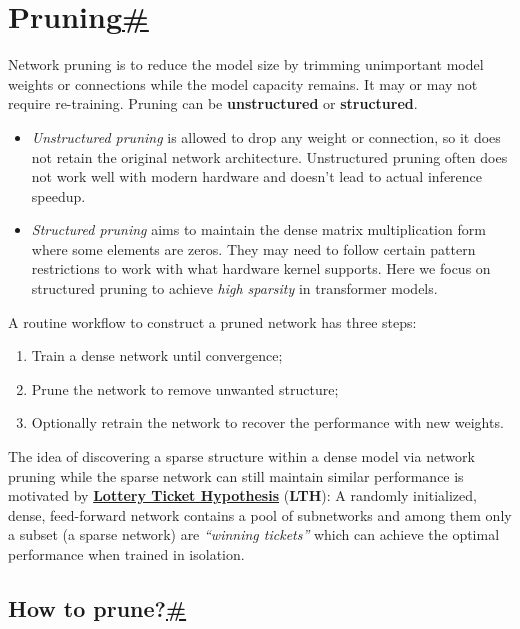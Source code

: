 \section{\texorpdfstring{Pruning\hyperref[pruning]{\#}}{Pruning\#}}\label{pruning}

Network pruning is to reduce the model size by trimming unimportant model weights or connections while the model capacity remains. It may or may not require re-training. Pruning can be \textbf{unstructured} or \textbf{structured}.

\begin{itemize}
\tightlist
\item
  \emph{Unstructured pruning} is allowed to drop any weight or connection, so it does not retain the original network architecture. Unstructured pruning often does not work well with modern hardware and doesn't lead to actual inference speedup.
\item
  \emph{Structured pruning} aims to maintain the dense matrix multiplication form where some elements are zeros. They may need to follow certain pattern restrictions to work with what hardware kernel supports. Here we focus on structured pruning to achieve \emph{high sparsity} in transformer models.
\end{itemize}

\label{routine-workflow}{}A routine workflow to construct a pruned network has three steps:

\begin{enumerate}
\tightlist
\item
  Train a dense network until convergence;
\item
  Prune the network to remove unwanted structure;
\item
  Optionally retrain the network to recover the performance with new weights.
\end{enumerate}

The idea of discovering a sparse structure within a dense model via network pruning while the sparse network can still maintain similar performance is motivated by \href{https://lilianweng.github.io/posts/2019-03-14-overfit/\#the-lottery-ticket-hypothesis}{\textbf{Lottery Ticket Hypothesis}} (\textbf{LTH}): A randomly initialized, dense, feed-forward network contains a pool of subnetworks and among them only a subset (a sparse network) are \emph{``winning tickets''} which can achieve the optimal performance when trained in isolation.

\subsection{\texorpdfstring{How to prune?\hyperref[how-to-prune]{\#}}{How to prune?\#}}\label{how-to-prune}


